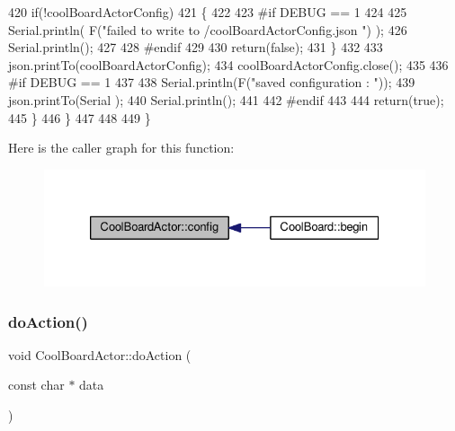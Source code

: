 \begin{DoxyCode}
420             \textcolor{keywordflow}{if}(!coolBoardActorConfig)
421             \{
422             
423 \textcolor{preprocessor}{            #if DEBUG == 1 }
424 
425                 Serial.println( F(\textcolor{stringliteral}{"failed to write to /coolBoardActorConfig.json "}) );
426                 Serial.println();
427             
428 \textcolor{preprocessor}{            #endif}
429                 
430                 \textcolor{keywordflow}{return}(\textcolor{keyword}{false});          
431             \}  
432 
433             json.printTo(coolBoardActorConfig);
434             coolBoardActorConfig.close();
435 
436 \textcolor{preprocessor}{        #if DEBUG == 1 }
437             
438             Serial.println(F(\textcolor{stringliteral}{"saved configuration : "}));
439             json.printTo(Serial );
440             Serial.println();       
441         
442 \textcolor{preprocessor}{        #endif}
443 
444             \textcolor{keywordflow}{return}(\textcolor{keyword}{true}); 
445         \}
446     \}   
447     
448 
449 \}
\end{DoxyCode}
Here is the caller graph for this function\+:\nopagebreak
\begin{figure}[H]
\begin{center}
\leavevmode
\includegraphics[width=326pt]{dc/d69/class_cool_board_actor_a5af5538fc7d169f63127e06d5219bcd4_icgraph}
\end{center}
\end{figure}
\mbox{\label{class_cool_board_actor_a96a45658d32c6b95caa2f385c7da32cd}} 
\subsubsection{\texorpdfstring{do\+Action()}{doAction()}}
{\footnotesize\ttfamily void Cool\+Board\+Actor\+::do\+Action (\begin{DoxyParamCaption}\item[{const char $\ast$}]{data }\end{DoxyParamCaption})}


